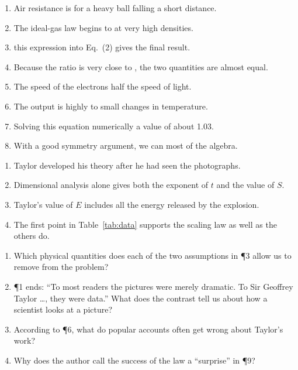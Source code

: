 \documentclass[11pt,a4paper]{article}
\begin{document}
\begin{enumerate}[label=\textbf{\arabic*.}]
  \item Air resistance is \underline{\hspace{2cm}} for a heavy ball falling a short distance.
  \item The ideal-gas law begins to \underline{\hspace{2cm}} at very high densities.
  \item \underline{\hspace{2cm}} this expression into Eq.~(2) gives the final result.
  \item Because the ratio is very close to \underline{\hspace{2cm}}, the two quantities are almost equal.
  \item The speed of the electrons \underline{\hspace{2cm}} half the speed of light.
  \item The output is highly \underline{\hspace{2cm}} to small changes in temperature.
  \item Solving this equation numerically \underline{\hspace{2cm}} a value of about 1.03.
  \item With a good symmetry argument, we can \underline{\hspace{2cm}} most of the algebra.
\end{enumerate}


\begin{enumerate}[label=\textbf{\arabic*.}]
  \item Taylor developed his theory after he had seen the photographs.
  \item Dimensional analysis alone gives both the exponent of $t$ and the value of $S$.
  \item Taylor's value of $E$ includes all the energy released by the explosion.
  \item The first point in Table~\ref{tab:data} supports the scaling law as well as the others do.
\end{enumerate}

\begin{enumerate}[label=\textbf{\arabic*.},resume]
  \item Which physical quantities does each of the two assumptions in ¶3 allow us to remove from the problem?
  \item ¶1 ends: ``To most readers the pictures were merely dramatic. To Sir Geoffrey Taylor \dots, they were data.'' What does the contrast tell us about how a scientist looks at a picture?
  \item According to ¶6, what do popular accounts often get wrong about Taylor's work?
  \item Why does the author call the success of the law a ``surprise'' in ¶9?
\end{enumerate}
\end{document}
